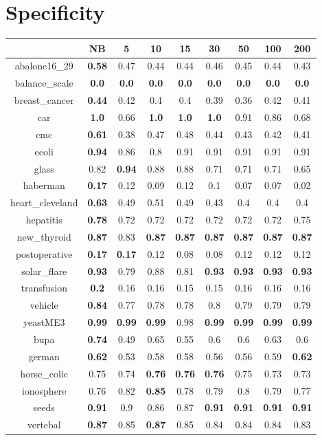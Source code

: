 \documentclass{article}%
\begin{document}
%
\section*{Specificity}%
\begin{tabular}{c|cccccccc}%
\hline%
&NB&5&10&15&30&50&100&200\\%
\hline%
abalone16\_29&\textbf{0.58}&0.47&0.44&0.44&0.46&0.45&0.44&0.43\\%
\hline%
balance\_scale&\textbf{0.0}&\textbf{0.0}&\textbf{0.0}&\textbf{0.0}&\textbf{0.0}&\textbf{0.0}&\textbf{0.0}&\textbf{0.0}\\%
\hline%
breast\_cancer&\textbf{0.44}&0.42&0.4&0.4&0.39&0.36&0.42&0.41\\%
\hline%
car&\textbf{1.0}&0.66&\textbf{1.0}&\textbf{1.0}&\textbf{1.0}&0.91&0.86&0.68\\%
\hline%
cmc&\textbf{0.61}&0.38&0.47&0.48&0.44&0.43&0.42&0.41\\%
\hline%
ecoli&\textbf{0.94}&0.86&0.8&0.91&0.91&0.91&0.91&0.91\\%
\hline%
glass&0.82&\textbf{0.94}&0.88&0.88&0.71&0.71&0.71&0.65\\%
\hline%
haberman&\textbf{0.17}&0.12&0.09&0.12&0.1&0.07&0.07&0.02\\%
\hline%
heart\_cleveland&\textbf{0.63}&0.49&0.51&0.49&0.43&0.4&0.4&0.4\\%
\hline%
hepatitis&\textbf{0.78}&0.72&0.72&0.72&0.72&0.72&0.72&0.75\\%
\hline%
new\_thyroid&\textbf{0.87}&0.83&\textbf{0.87}&\textbf{0.87}&\textbf{0.87}&\textbf{0.87}&\textbf{0.87}&\textbf{0.87}\\%
\hline%
postoperative&\textbf{0.17}&\textbf{0.17}&0.12&0.08&0.08&0.12&0.12&0.12\\%
\hline%
solar\_flare&\textbf{0.93}&0.79&0.88&0.81&\textbf{0.93}&\textbf{0.93}&\textbf{0.93}&\textbf{0.93}\\%
\hline%
transfusion&\textbf{0.2}&0.16&0.16&0.15&0.15&0.16&0.16&0.16\\%
\hline%
vehicle&\textbf{0.84}&0.77&0.78&0.78&0.8&0.79&0.79&0.79\\%
\hline%
yeastME3&\textbf{0.99}&\textbf{0.99}&\textbf{0.99}&0.98&\textbf{0.99}&\textbf{0.99}&\textbf{0.99}&\textbf{0.99}\\%
\hline%
bupa&\textbf{0.74}&0.49&0.65&0.55&0.6&0.6&0.63&0.6\\%
\hline%
german&\textbf{0.62}&0.53&0.58&0.58&0.56&0.56&0.59&\textbf{0.62}\\%
\hline%
horse\_colic&0.75&0.74&\textbf{0.76}&\textbf{0.76}&\textbf{0.76}&0.75&0.73&0.73\\%
\hline%
ionosphere&0.76&0.82&\textbf{0.85}&0.78&0.79&0.8&0.79&0.77\\%
\hline%
seeds&\textbf{0.91}&0.9&0.86&0.87&\textbf{0.91}&\textbf{0.91}&\textbf{0.91}&\textbf{0.91}\\%
\hline%
vertebal&\textbf{0.87}&0.85&\textbf{0.87}&0.85&0.84&0.84&0.84&0.83\\%
\hline%
\end{tabular}
\end{document}
